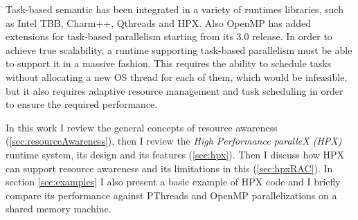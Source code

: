 
Task-based semantic has been integrated in a variety of runtimes libraries, such as Intel TBB\cite{contreras2008characterizing}, Charm++\cite{charmpp}, Qthreads\cite{qthreads} and HPX\cite{heller2017hpx}. Also OpenMP has added extensions for task-based parallelism starting from its 3.0 release\cite{omp30}.
In order to achieve true scalability, a runtime supporting task-based parallelism must be able to support it in a massive fashion. This requires the ability to schedule tasks without allocating a new OS thread for each of them, which would be infeasible, but it also requires adaptive resource management and task scheduling in order to ensure the required performance.

In this work I review the general concepts of resource awareness (\ref{sec:resourceAwareness}), then I review the \emph{High Performance paralleX (HPX)} runtime system, its design and its features (\ref{sec:hpx}). Then I discuss how HPX can support resource awareness and its limitations in this (\ref{sec:hpxRAC}).
In section \ref{sec:examples} I also present 
a basic example of HPX code and I briefly compare its performance against PThreads and OpenMP parallelizations on a shared memory machine.

